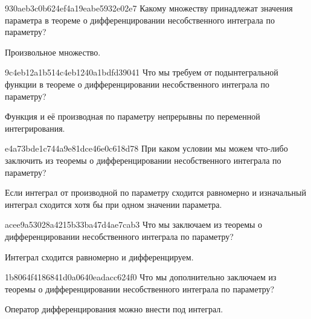 \begin{note}{930aeb3c0b624ef4a19eabe5932e02e7}
    Какому множеству принадлежат значения параметра в теореме о дифференцировании несобственного интеграла по параметру?

    \begin{cloze}{1}
        Произвольное множество.
    \end{cloze}
\end{note}

\begin{note}{9c4eb12a1b514c4eb1240a1bdfd39041}
    Что мы требуем от подынтегральной функции в теореме о дифференцировании несобственного интеграла по параметру?

    \begin{cloze}{1}
        Функция и её производная по параметру непрерывны по переменной интегрирования.
    \end{cloze}
\end{note}

\begin{note}{e4a73bde1c744a9e81dce46e0c618d78}
    При каком условии мы можем что-либо заключить из теоремы о дифференцировании несобственного интеграла по параметру?

    \begin{cloze}{1}
        Если интеграл от производной по параметру сходится равномерно и изначальный интеграл сходится хотя бы при одном значении параметра.
    \end{cloze}
\end{note}

\begin{note}{acee9a53028a4215b33ba47d4ae7cab3}
    Что мы заключаем из теоремы о дифференцировании несобственного интеграла по параметру?

    \begin{cloze}{1}
        Интеграл сходится равномерно и дифференцируем.
    \end{cloze}
\end{note}

\begin{note}{1b8064f4186841d0a0640eadacc624f0}
    Что мы дополнительно заключаем из теоремы о дифференцировании несобственного интеграла по параметру?

    \begin{cloze}{1}
        Оператор дифференцирования можно внести под интеграл.
    \end{cloze}
\end{note}

